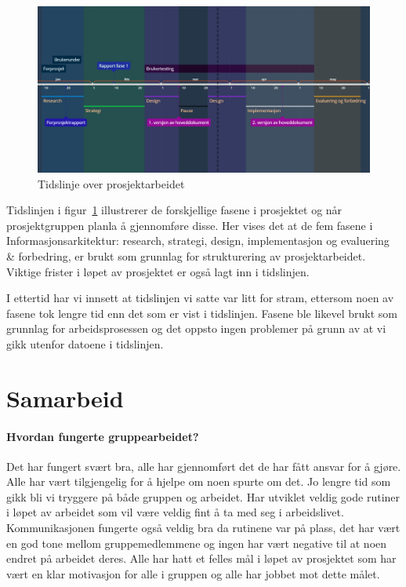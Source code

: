 \documentclass[11pt,a4paper]{report}
\begin{document}
\begin{figure}[H]
\includegraphics[width=\textwidth]{Illustrasjoner/tidslinje-revidert-igjen.png}
\caption{Tidslinje over prosjektarbeidet}
\label{fig:tidslinje}
\end{figure}

Tidslinjen i figur~\ref{fig:tidslinje} illustrerer de forskjellige fasene i prosjektet og når prosjektgruppen planla å gjennomføre disse. Her vises det at de fem fasene i Informasjonsarkitektur: research, strategi, design, implementasjon og evaluering \& forbedring, er brukt som grunnlag for strukturering av prosjektarbeidet. Viktige frister i løpet av prosjektet er også lagt inn i tidslinjen. 

I ettertid har vi innsett at tidslinjen vi satte var litt for stram, ettersom noen av fasene tok lengre tid enn det som er vist i tidslinjen. Fasene ble likevel brukt som grunnlag for arbeidsprosessen og det oppsto ingen problemer på grunn av at vi gikk utenfor datoene i tidslinjen.


\section*{Samarbeid}
\paragraph{Hvordan fungerte gruppearbeidet?}
Det har fungert svært bra, alle har gjennomført det de har fått ansvar for å gjøre. Alle har vært tilgjengelig for å hjelpe om noen spurte om det. Jo lengre tid som gikk bli vi tryggere på både gruppen og arbeidet. Har utviklet veldig gode rutiner i løpet av arbeidet som vil være veldig fint å ta med seg i arbeidslivet. Kommunikasjonen fungerte også veldig bra da rutinene var på plass, det har vært en god tone mellom gruppemedlemmene og ingen har vært negative til at noen endret på arbeidet deres. Alle har hatt et felles mål i løpet av prosjektet som har vært en klar motivasjon for alle i gruppen og alle har jobbet mot dette målet.
\end{document}

